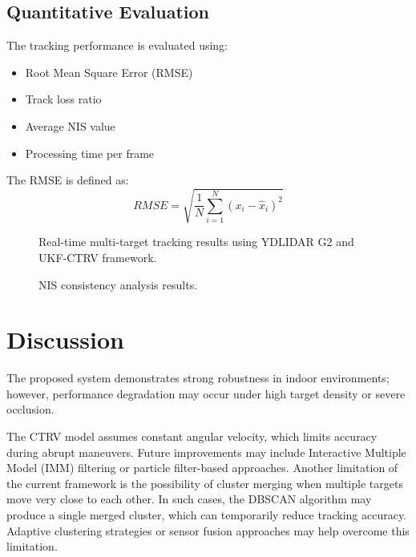 \documentclass[conference]{IEEEtran}
\begin{document}
\subsection{Quantitative Evaluation}
The tracking performance is evaluated using:
\begin{itemize}
    \item Root Mean Square Error (RMSE)
    \item Track loss ratio
    \item Average NIS value
    \item Processing time per frame
\end{itemize}
The RMSE is defined as:
\begin{equation}
RMSE=\sqrt{\frac{1}{N}\sum_{i=1}^{N}(x_{i}-\hat{x}_{i})^2}
\end{equation}

\begin{figure}[htbp]
\centering
\caption{Real-time multi-target tracking results using YDLIDAR G2 and UKF-CTRV framework.}
\label{fig1}
\end{figure}

\begin{figure}[htbp]
\centering
\caption{NIS consistency analysis results.}
\label{fig2}
\end{figure}

\section{Discussion}
The proposed system demonstrates strong robustness in indoor environments; however, performance degradation may occur under high target density or severe occlusion.

The CTRV model assumes constant angular velocity, which limits accuracy during abrupt maneuvers. Future improvements may include Interactive Multiple Model (IMM) filtering or particle filter-based approaches. Another limitation of the current framework is the possibility of cluster merging when multiple targets move very close to each other. In such cases, the DBSCAN algorithm may produce a single merged cluster, which can temporarily reduce tracking accuracy. Adaptive clustering strategies or sensor fusion approaches may help overcome this limitation.
\end{document}
